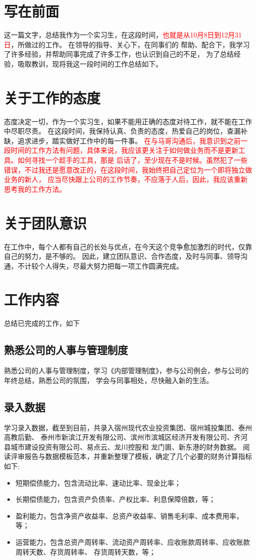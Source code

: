 \documentclass[UTF8,AutoFakeBold]{ctexart}
\begin{document}

\thispagestyle{empty}
\newpage 
\tableofcontents
\thispagestyle{empty}
\newpage 

\setcounter{page}{1}
\section{写在前面}
这一篇文字，总结我作为一个实习生，在这段时间，\textcolor{red}{也就是从10月8日到12月31日}，所做过的工作。
在领导的指导、关心下，在同事们的
帮助、配合下，我学习了许多经验，并帮助同事完成了许多工作，也认识到自己的不足，
为了总结经验，吸取教训，现将我这一段时间的工作总结如下。
\section{关于工作的态度}
态度决定一切，作为一个实习生，如果不能用正确的态度对待工作，就不能在工作中尽职尽责。
在这段时间，我保持认真、负责的态度，热爱自己的岗位，查漏补缺，追求进步，踏实做好工作中的每一件事。\textcolor{red}{
在与马哥沟通后，我意识到之前一段时间的工作方法有问题，具体来说，我应该更关注于如何做业务而不是更新工具。如何寻找一个趁手的工具，那是
后话了，至少现在不是时候。虽然犯了一些错误，不过我还是愿意改正的，在这段时间，我始终把自己定位为一个即将独立做业务的新人，
应当尽快跟上公司的工作节奏，不应落于人后，因此，我应该重新思考我的工作方法。}
\section{关于团队意识}
在工作中，每个人都有自己的长处与优点，在今天这个竞争愈加激烈的时代，仅靠自己的努力，是不够的。
因此，建立团队意识、合作态度，及时与同事、领导沟通，不计较个人得失，尽最大努力把每一项工作圆满完成。
\section{工作内容}
总结已完成的工作，如下
\subsection{熟悉公司的人事与管理制度}
熟悉公司的人事与管理制度，学习《内部管理制度》，参与公司例会，参与公司的年终总结，熟悉公司的氛围，
学会与同事相处，尽快融入新的生活。
\subsection{录入数据}
学习录入数据，截至到目前，共录入宿州现代农业投资集团、宿州城投集团、泰州高教后勤、
泰州市新滨江开发有限公司、滨州市滨城区经济开发有限公司、齐河县城市建设投资有限公司、易点云、龙川控股和
龙门崮、新东港的财务数据。
阅读评审报告与数据模板范本，并重新整理了模板，确定了几个必要的财务计算指标如下:
\begin{itemize}
    \item 短期偿债能力，包含流动比率、速动比率、现金比率；
    \item 长期偿债能力，包含资产负债率、产权比率、利息保障倍数，等；
    \item 盈利能力，包含净资产收益率、总资产收益率、销售毛利率、成本费用率，等；
    \item 运营能力，包含总资产周转率、流动资产周转率、应收账款周转率、应收账款周转天数、存货周转率、
    存货周转天数，等；
\end{itemize}
\end{document}
